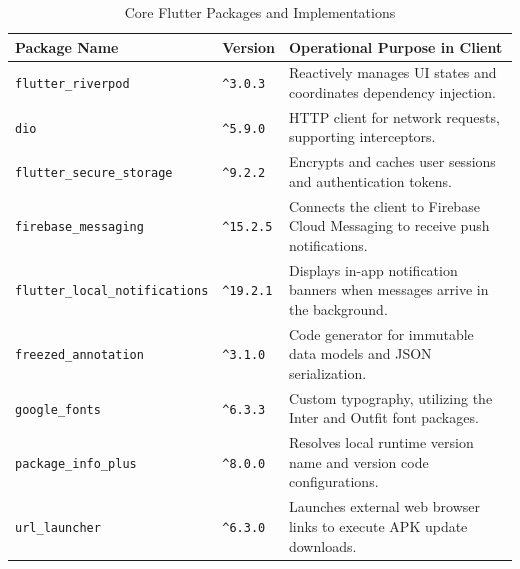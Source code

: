 \begin{table}[htbp]
\centering
\caption{Core Flutter Packages and Implementations}
\label{tab:development_packages}
\begin{tabular}{|l|l|p{7.5cm}|}
\hline
\textbf{Package Name} & \textbf{Version} & \textbf{Operational Purpose in Client} \\ \hline
\texttt{flutter\_riverpod} & \texttt{\^{}3.0.3} & Reactively manages UI states and coordinates dependency injection. \\ \hline
\texttt{dio} & \texttt{\^{}5.9.0} & HTTP client for network requests, supporting interceptors. \\ \hline
\texttt{flutter\_secure\_storage} & \texttt{\^{}9.2.2} & Encrypts and caches user sessions and authentication tokens. \\ \hline
\texttt{firebase\_messaging} & \texttt{\^{}15.2.5} & Connects the client to Firebase Cloud Messaging to receive push notifications. \\ \hline
\texttt{flutter\_local\_notifications} & \texttt{\^{}19.2.1} & Displays in-app notification banners when messages arrive in the background. \\ \hline
\texttt{freezed\_annotation} & \texttt{\^{}3.1.0} & Code generator for immutable data models and JSON serialization. \\ \hline
\texttt{google\_fonts} & \texttt{\^{}6.3.3} & Custom typography, utilizing the Inter and Outfit font packages. \\ \hline
\texttt{package\_info\_plus} & \texttt{\^{}8.0.0} & Resolves local runtime version name and version code configurations. \\ \hline
\texttt{url\_launcher} & \texttt{\^{}6.3.0} & Launches external web browser links to execute APK update downloads. \\ \hline
\end{tabular}
\end{table}

